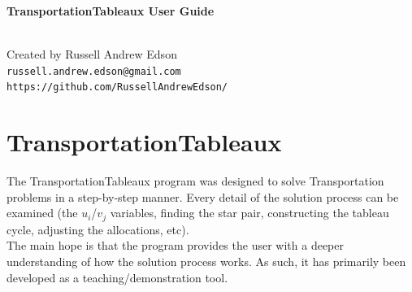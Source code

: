 \documentclass[a4paper,12pt]{article}
\begin{document}
\Huge\textbf{TransportationTableaux User Guide} \\ \hspace*{1cm} \hrulefill \\
\normalsize

Created by Russell Andrew Edson \\
\texttt{russell.andrew.edson@gmail.com}\\
\texttt{https://github.com/RussellAndrewEdson/}\\

\begin{figure}[h!]
\centering
{}
\end{figure}

\section*{TransportationTableaux}

The TransportationTableaux program was designed to solve Transportation problems in a step-by-step manner. Every detail of the solution process can be examined (the $u_i$/$v_j$ variables, finding the star pair, constructing the tableau cycle, adjusting the allocations, etc).\\

The main hope is that the program provides the user with a deeper understanding of how the solution process works. As such, it has primarily been developed as a teaching/demonstration tool.\\
\end{document}
